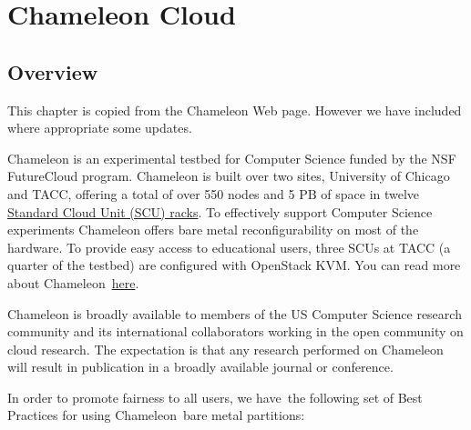 
\chapter{Chameleon Cloud}
\label{C:chameleon}

\section{Overview}

\FILENAME

This chapter is copied from the Chameleon Web page. However we have
included where appropriate some updates. 

Chameleon is an experimental testbed for Computer Science funded by the
NSF FutureCloud program. Chameleon is built over two sites, University
of Chicago and TACC, offering a total of over 550 nodes and 5 PB of
space in twelve
\href{https://www.chameleoncloud.org/about/hardware-description/}{Standard
Cloud Unit (SCU) racks}. To effectively support Computer Science
experiments Chameleon offers bare metal reconfigurability on most of the
hardware. To provide easy access to educational users, three SCUs at
TACC (a quarter of the testbed) are configured with OpenStack KVM. You
can read more about
Chameleon~\href{https://www.chameleoncloud.org/about/chameleon/}{here}.

Chameleon is broadly available to members of the US Computer Science
research community and its international collaborators working in the
open community on cloud research. The expectation is that any research
performed on Chameleon will result in publication in a broadly
available journal or conference.

In order to promote fairness to all users, we have~the following set of
Best Practices for using Chameleon~bare metal partitions:

